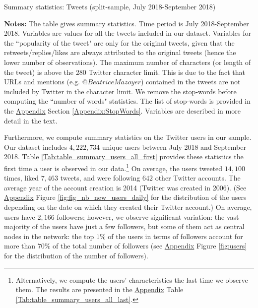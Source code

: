 \begin{table}
\caption{Summary statistics: Tweets (split-sample, July 2018-September 2018)}
\begin{center}
	
\end{center}
\begin{spacing}{0.5}
	{\fns \textbf{Notes:} The table gives summary statistics. Time period is July 2018-September 2018. Variables are values for all the tweets included in our dataset. Variables for the ``popularity of the tweet" are only for the original tweets, given that the retweets/replies/likes are always attributed to the original tweets (hence the lower number of observations). The maximum number of characters (or length of the tweet) is above the $280$ Twitter character limit. This is due to the fact that URLs and mentions (e.g. $@BeatriceMazoyer$) contained in the tweets are not included by Twitter in the character limit. We remove the stop-words before computing the ``number of words" statistics. The list of stop-words is provided in the \hyperlink{ref:Appendix}{Appendix} Section \ref{Appendix:StopWords}. Variables are described in more detail in the text.} 
\end{spacing}
\label{Tab:sum_stat_tweets_split_sample}
\end{table} 

Furthermore, we compute summary statistics on the Twitter users in our sample. Our dataset includes $4,222,734$ unique users between July 2018 and September 2018. Table \ref{Tab:table_summary_users_all_first} provides these statistics the first time a user is observed in our data.\footnote{Alternatively, we compute the users' characteristics the last time we observe them. The results are presented in the \hyperlink{ref:Appendix}{Appendix} Table \ref{Tab:table_summary_users_all_last}.} On average, the users tweeted $14,100$ times, liked $7,463$ tweets, and were following $642$ other Twitter accounts. The average year of the account creation is 2014 (Twitter was created in 2006). (See \hyperlink{ref:Appendix}{Appendix} Figure \ref{fig:fig_nb_new_users_daily} for the distribution of the users depending on the date on which they created their Twitter account.) On average, users have $2,166$ followers; however, we observe significant variation: the vast majority of the users have just a few followers, but some of them act as central nodes in the network: the top $1\%$ of the users in terms of followers  account for more than $70\%$ of the total number of followers (see \hyperlink{ref:Appendix}{Appendix} Figure \ref{fig:users} for the distribution of the number of followers).

